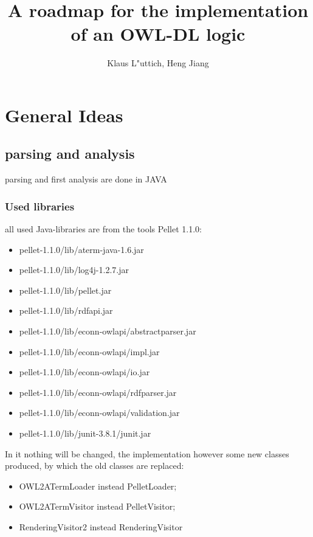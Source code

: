 \documentclass[11pt,a4paper]{article}
\begin{document}
\title{A roadmap for the implementation of an OWL-DL logic}
\author{Klaus L"uttich, Heng Jiang}
\maketitle


\section{General Ideas}

\subsection{parsing and analysis}
parsing and first analysis are done in JAVA
   \subsubsection{Used libraries}
   all used Java-libraries are from the tools Pellet 1.1.0:
   \begin{itemize}
   \item pellet-1.1.0/lib/aterm-java-1.6.jar
   \item pellet-1.1.0/lib/log4j-1.2.7.jar
   \item pellet-1.1.0/lib/pellet.jar
   \item pellet-1.1.0/lib/rdfapi.jar  
   \item pellet-1.1.0/lib/econn-owlapi/abstractparser.jar
   \item pellet-1.1.0/lib/econn-owlapi/impl.jar
   \item pellet-1.1.0/lib/econn-owlapi/io.jar  
   \item pellet-1.1.0/lib/econn-owlapi/rdfparser.jar
   \item pellet-1.1.0/lib/econn-owlapi/validation.jar
   \item pellet-1.1.0/lib/junit-3.8.1/junit.jar
   \end{itemize}
In it nothing will be changed, the implementation however some new classes produced, by which the old classes are replaced:
   \begin{itemize}
      \item OWL2ATermLoader instead PelletLoader;
   	  \item OWL2ATermVisitor instead PelletVisitor;
      \item RenderingVisitor2 instead RenderingVisitor
   \end{itemize}
\end{document}

